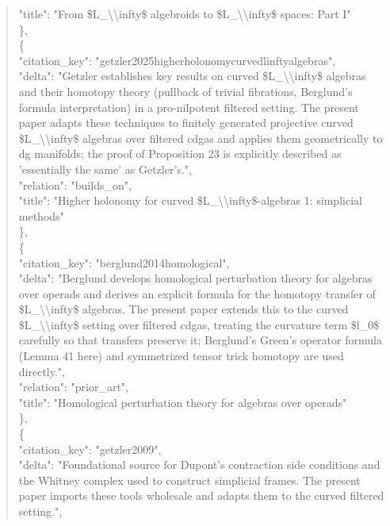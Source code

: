 \documentclass[11pt]{article}
\begin{document}
\begin{quote}
      "title": "From \$L\_\textbackslash{}\textbackslash{}infty\$ algebroids to \$L\_\textbackslash{}\textbackslash{}infty\$ spaces: Part I"\\
    \},\\
    \{\\
      "citation\_key": "getzler2025higherholonomycurvedlinftyalgebras",\\
      "delta": "Getzler establishes key results on curved \$L\_\textbackslash{}\textbackslash{}infty\$ algebras and their homotopy theory (pullback of trivial fibrations, Berglund's formula interpretation) in a pro-nilpotent filtered setting. The present paper adapts these techniques to finitely generated projective curved \$L\_\textbackslash{}\textbackslash{}infty\$ algebras over filtered cdgas and applies them geometrically to dg manifolds; the proof of Proposition 23 is explicitly described as 'essentially the same' as Getzler's.",\\
      "relation": "builds\_on",\\
      "title": "Higher holonomy for curved \$L\_\textbackslash{}\textbackslash{}infty\$-algebras 1: simplicial methods"\\
    \},\\
    \{\\
      "citation\_key": "berglund2014homological",\\
      "delta": "Berglund develops homological perturbation theory for algebras over operads and derives an explicit formula for the homotopy transfer of \$L\_\textbackslash{}\textbackslash{}infty\$ algebras. The present paper extends this to the curved \$L\_\textbackslash{}\textbackslash{}infty\$ setting over filtered cdgas, treating the curvature term \$l\_0\$ carefully so that transfers preserve it; Berglund's Green's operator formula (Lemma 41 here) and symmetrized tensor trick homotopy are used directly.",\\
      "relation": "prior\_art",\\
      "title": "Homological perturbation theory for algebras over operads"\\
    \},\\
    \{\\
      "citation\_key": "getzler2009",\\
      "delta": "Foundational source for Dupont's contraction side conditions and the Whitney complex used to construct simplicial frames. The present paper imports these tools wholesale and adapts them to the curved filtered setting.",\\

\end{quote}
\end{document}
